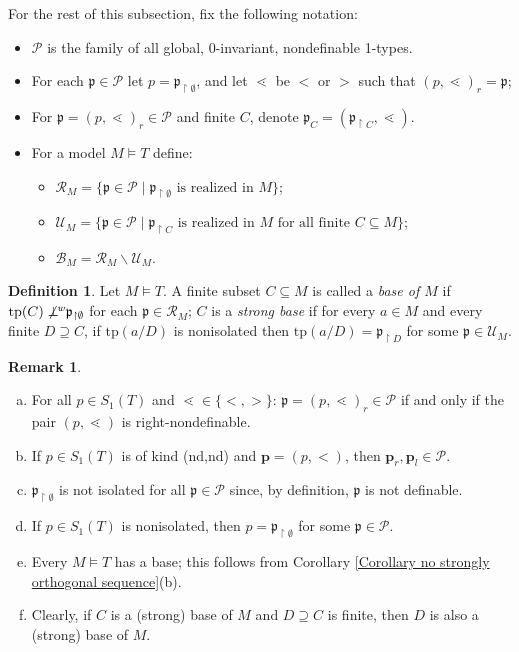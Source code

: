 \documentclass{amsart}
\theoremstyle{definition}
\theoremstyle{definition}
\newtheorem{Definition}[Theorem]{Definition}
\newtheorem{Remark}[Theorem]{Remark}
\def\strok{\restriction}
\newcommand{\nwor}{\not\perp\hspace*{-0.4em}^{\mathit w}}
\newcommand{\tp}{\mathrm{tp}}
\begin{document}
For the rest of this subsection, fix the following notation: 
\begin{itemize}
\item $\mathcal P$ is the family of all global, $0$-invariant, nondefinable 1-types.
    \item For each $\mathfrak p\in\mathcal P$ let $p=\mathfrak p_{\strok\emptyset}$, and let 
    $\lessdot$ be $<$ or $>$ such that $(p,\lessdot)_r=\mathfrak p$;
    \item For $\mathfrak p=(p,\lessdot)_r\in\mathcal P$ and finite $C$, denote  $\mathfrak p_C=(\mathfrak p_{\strok C},\lessdot)$.
    \item For a model $M\models T$ define:
        \begin{itemize}
            \item $\mathcal R_M=\{\mathfrak p\in\mathcal P\mid \mathfrak p_{\strok \emptyset}\text{ is realized in }M\}$;
            \item $\mathcal U_M=\{\mathfrak p\in\mathcal P\mid  \mathfrak p_{\strok C}\text{ is realized in }M \text{ for all finite } C\subseteq M\}$;
            \item $\mathcal B_M=\mathcal R_M\smallsetminus\mathcal U_M$.
        \end{itemize}
\end{itemize}
 

\begin{Definition}
    Let $M\models T$. A finite subset $C\subseteq M$ is called a {\em base of $M$} if $\tp(C)\nwor\mathfrak p_{\strok\emptyset}$ for each $\mathfrak p\in\mathcal R_M$; $C$ is a {\em strong base} if for every $a\in M$ and every finite $D\supseteq C$, if $\tp(a/D)$ is nonisolated then $\tp(a/D)=\mathfrak p_{\strok D}$ for some $\mathfrak p\in\mathcal U_M$.
\end{Definition}

\begin{Remark}\label{Remark ALMOST bases}
    \begin{enumerate}[(a)]
    \item For all $p\in S_1(T)$ and $\lessdot\in\{<,>\}$:  $\mathfrak p=(p,\lessdot)_r\in \mathcal P$ if and only if the pair $(p,\lessdot)$ is right-nondefinable.
    \item If $p\in S_1(T)$ is of kind (nd,nd) and $\mathbf p=(p,<)$, then $\mathbf p_r, \mathbf p_l\in \mathcal P$. 
    \item  $\mathfrak p_{\strok \emptyset}$ is not isolated for all $\mathfrak p\in \mathcal P$ since, by definition, $\mathfrak p$ is not definable.
    \item If $p\in S_1(T)$ is nonisolated, then $p=\mathfrak p_{\strok \emptyset}$ for some $\mathfrak p\in \mathcal P$.
    \item Every $M\models T$ has a base; this follows from Corollary \ref{Corollary no strongly orthogonal sequence}(b). 
    \item Clearly, if $C$ is a (strong) base of $M$ and $D\supseteq C$ is finite, then $D$ is also a (strong) base of $M$.
    \end{enumerate}
\end{Remark}
\end{document}
